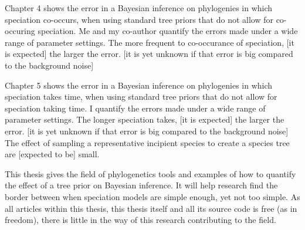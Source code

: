 Chapter 4 shows the error in a Bayesian inference on
phylogenies in which speciation co-occurs, when using standard
tree priors that do not allow for co-occuring speciation.
Me and my co-author quantify the errors made under a wide range
of parameter settings. The more frequent to co-occurance of speciation,
[it is expected] the larger the error. 
[it is yet unknown if that error is big compared to the background noise]

Chapter 5 shows the error in a Bayesian inference on
phylogenies in which speciation takes time, when using standard
tree priors that do not allow for speciation taking time.
I quantify the errors made under a wide range
of parameter settings. The longer speciation takes, [it is expected] the larger the error. 
[it is yet unknown if that error is big compared to the background noise]
The effect of sampling a representative incipient species to create
a species tree are [expected to be] small.

This thesis gives the field of phylogenetics tools and examples of
how to quantify the effect of a tree prior on Bayesian inference.
It will help research find the border between when speciation models are
simple enough, yet not too simple. As all articles within this thesis,
this thesis itself and all its source code is free (as in freedom),
there is little in the way of this research contributing to the field. 


